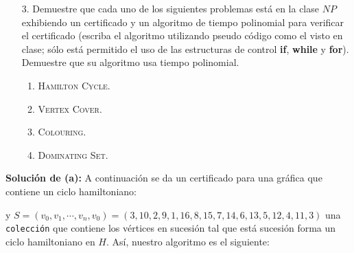 \documentclass{article}
\newcommand{\code}[1]{\textcolor{white!25!black}{\texttt{#1}}}
\begin{document}
\begin{enumerate}
  \item[3.] Demuestre que cada uno de los siguientes problemas est\'a en la clase
    $NP$ exhibiendo un certificado y un algoritmo de tiempo polinomial para
    verificar el certificado (escriba el algoritmo utilizando pseudo c\'odigo
    como el visto en clase; s\'olo est\'a permitido el uso de las estructuras de
    control {\bf if}, {\bf while} y {\bf for}).   Demuestre que su algoritmo
    usa tiempo polinomial.
    \begin{enumerate}
    \item \textsc{Hamilton Cycle}.
    \item \textsc{Vertex Cover}.
    \item \textsc{Colouring}.
    \item \textsc{Dominating Set}.
    \end{enumerate}
\end{enumerate}
\textbf{Soluci\'on de (a):}
A continuaci\'on se da un certificado para una gr\'afica que contiene un ciclo hamiltoniano:

\begin{center}
\end{center}

y $S = (v_0, v_1, \dotsm, v_n, v_0) = (3, 10, 2, 9, 1, 16, 8, 15, 7, 14, 6, 13, 5, 12, 4, 11, 3)$
una \code{colecci\'on} que contiene los v\'ertices en sucesi\'on tal que est\'a sucesi\'on forma
un ciclo hamiltoniano en $H$.
As\'i, nuestro algoritmo es el siguiente:
\end{document}
